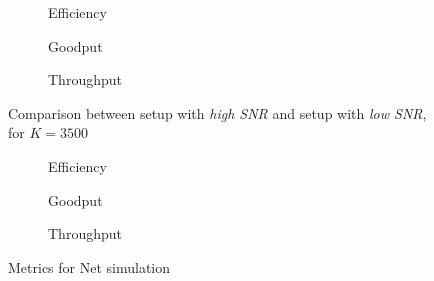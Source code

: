 \begin{figure}[!hp]
\centering
\begin{subfigure}{0.23\textwidth}
	\captionsetup{justification=centering,font=scriptsize}
	\centering
	\setlength\fwidth{\textwidth}
	\setlength{}
	
	\caption{Efficiency}
	\label{fig:wifi_eff_lsnr_3500}
\end{subfigure}\hspace{2em}%
\begin{subfigure}{0.23\textwidth}
	\captionsetup{justification=centering,font=scriptsize}
	\centering
	\setlength\fwidth{\textwidth}
	\setlength{}
	
	\caption{Goodput}
	\label{fig:wifi_good_lsnr_3500}
\end{subfigure}\hspace{2em}%
\begin{subfigure}{0.23\textwidth}
	\captionsetup{justification=centering,font=scriptsize}
	\centering
	\setlength\fwidth{\textwidth}
	\setlength{}
	
	\caption{Throughput}
	\label{fig:wifi_thr_lsnr_3500}
\end{subfigure}
\caption{Comparison between setup with \textit{high SNR} and setup with \textit{low SNR}, for $K=3500$}
\label{fig:wifi_lsnr_3500}
\end{figure}
\begin{figure}[!hp]
\centering
\begin{subfigure}{0.23\textwidth}
	\captionsetup{justification=centering,font=scriptsize}
	\centering
	\setlength\fwidth{\textwidth}
	\setlength{}
	
	\caption{Efficiency}
	\label{fig:net_eff}
\end{subfigure}\hspace{2em}%
\begin{subfigure}{0.23\textwidth}
	\captionsetup{justification=centering,font=scriptsize}
	\centering
	\setlength\fwidth{\textwidth}
	\setlength{}
	
	\caption{Goodput}
	\label{fig:net_good}
\end{subfigure}\hspace{2em}%
\begin{subfigure}{0.23\textwidth}
	\captionsetup{justification=centering,font=scriptsize}
	\centering
	\setlength\fwidth{\textwidth}
	\setlength{}
	
	\caption{Throughput}
	\label{fig:net_thr}
\end{subfigure}
\caption{Metrics for Net simulation}
\label{fig:net}
\end{figure}
